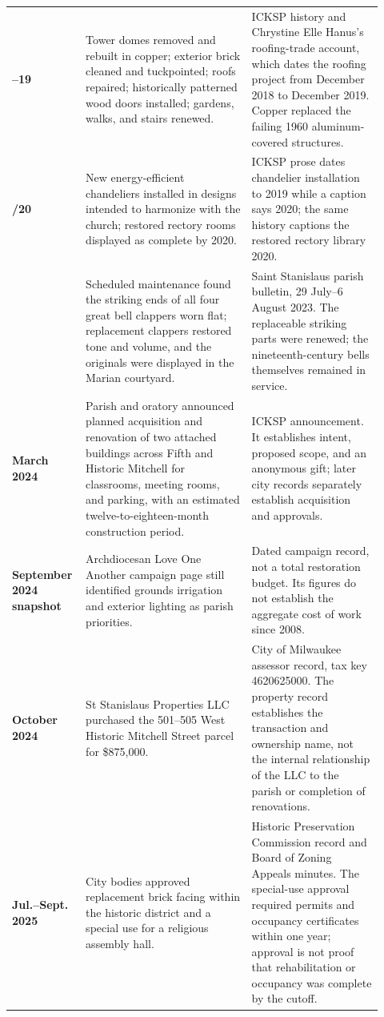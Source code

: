\begin{longtable}{>{\bfseries\RaggedRight\arraybackslash}p{0.15\linewidth}>{\RaggedRight\arraybackslash}p{0.43\linewidth}>{\RaggedRight\arraybackslash}p{0.34\linewidth}}
2018--19 & Tower domes removed and rebuilt in copper; exterior brick cleaned and tuckpointed; roofs repaired; historically patterned wood doors installed; gardens, walks, and stairs renewed. & ICKSP history and Chrystine Elle Hanus's roofing-trade account, which dates the roofing project from December 2018 to December 2019. Copper replaced the failing 1960 aluminum-covered structures.\\

2019/20 & New energy-efficient chandeliers installed in designs intended to harmonize with the church; restored rectory rooms displayed as complete by 2020. & ICKSP prose dates chandelier installation to 2019 while a caption says 2020; the same history captions the restored rectory library 2020.\\

2023 & Scheduled maintenance found the striking ends of all four great bell clappers worn flat; replacement clappers restored tone and volume, and the originals were displayed in the Marian courtyard. & Saint Stanislaus parish bulletin, 29 July--6 August 2023. The replaceable striking parts were renewed; the nineteenth-century bells themselves remained in service.\\

March 2024 & Parish and oratory announced planned acquisition and renovation of two attached buildings across Fifth and Historic Mitchell for classrooms, meeting rooms, and parking, with an estimated twelve-to-eighteen-month construction period. & ICKSP announcement. It establishes intent, proposed scope, and an anonymous gift; later city records separately establish acquisition and approvals.\\

September 2024 snapshot & Archdiocesan Love One Another campaign page still identified grounds irrigation and exterior lighting as parish priorities. & Dated campaign record, not a total restoration budget. Its figures do not establish the aggregate cost of work since 2008.\\

17 October 2024 & St Stanislaus Properties LLC purchased the 501--505 West Historic Mitchell Street parcel for \$875,000. & City of Milwaukee assessor record, tax key 4620625000. The property record establishes the transaction and ownership name, not the internal relationship of the LLC to the parish or completion of renovations.\\

Jul.--Sept. 2025 & City bodies approved replacement brick facing within the historic district and a special use for a religious assembly hall. & Historic Preservation Commission record and Board of Zoning Appeals minutes. The special-use approval required permits and occupancy certificates within one year; approval is not proof that rehabilitation or occupancy was complete by the cutoff.\\
\end{longtable}
